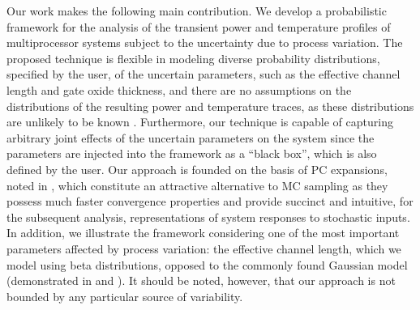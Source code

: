 Our work makes the following main contribution.
We develop a probabilistic framework for the analysis of the transient power and temperature profiles of multiprocessor systems subject to the uncertainty due to process variation.
The proposed technique is flexible in modeling diverse probability distributions, specified by the user, of the uncertain parameters, such as the effective channel length and gate oxide thickness, and there are no assumptions on the distributions of the resulting power and temperature traces, as these distributions are unlikely to be known \apriori.
Furthermore, our technique is capable of capturing arbitrary joint effects of the uncertain parameters on the system since the parameters are injected into the framework as a ``black box'', which is also defined by the user.
Our approach is founded on the basis of PC expansions, noted in , which constitute an attractive alternative to MC sampling as they possess much faster convergence properties and provide succinct and intuitive, for the subsequent analysis, representations of system responses to stochastic inputs.
In addition, we illustrate the framework considering one of the most important parameters affected by process variation: the effective channel length, which we model using beta distributions, opposed to the commonly found Gaussian model (demonstrated in  and ).
It should be noted, however, that our approach is not bounded by any particular source of variability.
